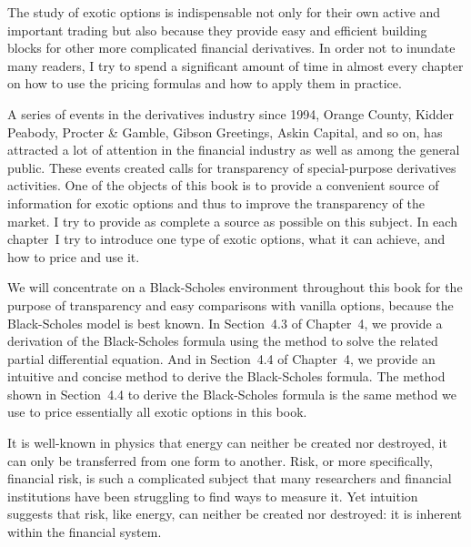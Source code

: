 The study of exotic options is indispensable not only for their own
active and important trading but also because they provide easy and
efficient building blocks for other more complicated financial
derivatives. In order not to inundate many readers, I try to spend a
significant amount of time in almost every chapter on how to use the
pricing formulas and how to apply them in practice.

A series of events in the derivatives industry since 1994, Orange
County, Kidder Peabody, Procter \& Gamble, Gibson Greetings, Askin
Capital, and so on, has attracted a lot of attention in the financial
industry as well as among the general public. These events created
calls for transparency of special-purpose derivatives activities. One
of the objects of this book is to provide a convenient source of
information for exotic options and thus to improve the transparency
of the  market. I try to provide as complete a source as possible on
this subject. In each chapter~I try to introduce one type of exotic
options, what it can achieve, and how to price and use it.

We will concentrate on a Black-Scholes environment throughout this
book for the purpose of transparency and easy comparisons with vanilla
options, because the Black-Scholes model is best known. In Section~4.3
of Chapter~4, we provide a derivation of the Black-Scholes formula
using the method to solve the related partial differential
equation. And in Section~4.4 of Chapter~4, we provide an intuitive and
concise method to derive the Black-Scholes formula. The method shown
in Section~4.4 to derive the Black-Scholes formula is the same method
we use to price essentially all exotic options in this book.

It is well-known in physics that energy can neither be created nor
destroyed, it can  only be transferred from one form to another.
Risk, or more specifically, financial risk, is such a complicated
subject that many researchers and financial institutions have been
struggling to find ways to measure it. Yet intuition suggests that
risk, like energy, can neither be created nor destroyed: it is
inherent within the financial system.



